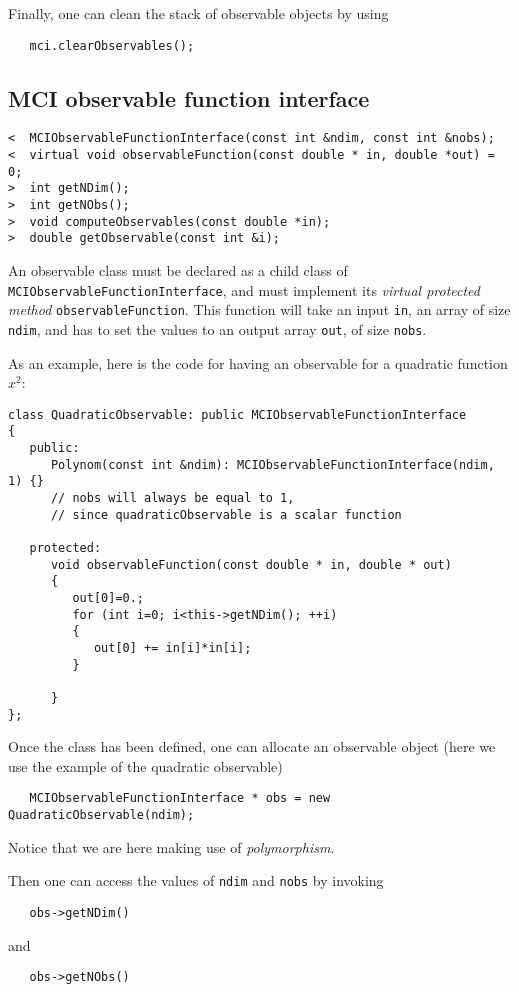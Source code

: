 \documentclass[11pt,a4paper,twoside]{article}
\begin{document}
Finally, one can clean the stack of observable objects by using
\begin{verbatim}
   mci.clearObservables();
\end{verbatim}


\subsection{MCI observable function interface} %
\label{sub:mciobservablefunctioninterface}

\begin{verbatim}
<  MCIObservableFunctionInterface(const int &ndim, const int &nobs);
<  virtual void observableFunction(const double * in, double *out) = 0;
>  int getNDim();
>  int getNObs();
>  void computeObservables(const double *in);
>  double getObservable(const int &i);
\end{verbatim}

An observable class must be declared as a child class of \verb+MCIObservableFunctionInterface+, and must implement its \emph{virtual protected method} \verb+observableFunction+.
This function will take an input \verb+in+, an array of size \verb+ndim+, and has to set the values to an output array \verb+out+, of size \verb+nobs+.

As an example, here is the code for having an observable for a quadratic function $x^2$:
\begin{verbatim}
class QuadraticObservable: public MCIObservableFunctionInterface
{
   public:
      Polynom(const int &ndim): MCIObservableFunctionInterface(ndim, 1) {}
      // nobs will always be equal to 1,
      // since quadraticObservable is a scalar function

   protected:
      void observableFunction(const double * in, double * out)
      {
         out[0]=0.;
         for (int i=0; i<this->getNDim(); ++i)
         {
            out[0] += in[i]*in[i];
         }

      }
};
\end{verbatim}

Once the class has been defined, one can allocate an observable object (here we use the example of the quadratic observable)
\begin{verbatim}
   MCIObservableFunctionInterface * obs = new QuadraticObservable(ndim);
\end{verbatim}
Notice that we are here making use of \emph{polymorphism}.

Then one can access the values of \verb+ndim+ and \verb+nobs+ by invoking
\begin{verbatim}
   obs->getNDim()
\end{verbatim}
and
\begin{verbatim}
   obs->getNObs()
\end{verbatim}
\end{document}
